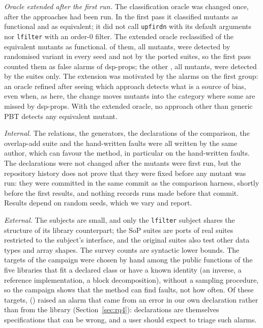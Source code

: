 \documentclass[10pt,conference]{IEEEtran}
\newcommand{\code}[1]{\texttt{#1}}
\begin{document}
\emph{Oracle extended after the first run.} The classification oracle was
changed once, after the approaches had been run. In the first pass it
classified \oracleFirstFunctional{} mutants as functional and
\oracleFirstEquivalent{} as equivalent; it did not call \code{upfirdn} with its
default arguments nor \code{lfilter} with an order-0 filter. The extended
oracle reclassified \nReclassified{} of the equivalent mutants as functional.
\reclDspOnly{} of them, all \reclDspOnlySubject{} mutants, were detected by
\reclDspAllVariants{} randomised variant in every seed and not by the ported
suites, so the first pass counted them as false alarms of dsp-props; the other
\reclSopOnly{}, all \reclSopOnlySubject{} mutants, were detected by the suites
only. The extension was motivated by the alarms on the first group: an oracle
refined after seeing which approach detects what is a source of bias, even
when, as here, the change moves mutants into the category where some are
missed by dsp-props. With the extended oracle, no approach other than generic
PBT detects any equivalent mutant.

\emph{Internal.} The relations, the generators, the declarations of the
comparison, the overlap-add suite and the hand-written faults were all written
by the same author, which can favour the method, in particular on the
hand-written faults. The declarations were not changed after the mutants were
first run, but the repository history does not prove that they were fixed before any mutant
was run: they were committed in the same commit as the comparison harness,
shortly before the first results, and nothing records runs made before that
commit. Results depend on random seeds, which we
vary and report.

\emph{External.} The subjects are small, and only the \code{lfilter} subject
shares the structure of its library counterpart; the SoP suites are ports of
real suites restricted to the subject's interface, and the original suites
also test other data types and array shapes. The survey counts are syntactic
lower bounds. The \campaignTargets{} targets of the campaign were chosen by
hand among the public functions of the five libraries that fit a declared
class or have a known identity (an inverse, a reference implementation, a
block decomposition), without a sampling procedure, so the campaign shows that
the method can find faults, not how often. Of these targets,
\campaignTriaged{} (\campaignTriagedShare) raised an alarm that came from an
error in our own declaration rather than from the library
(Section~\ref{sec:rq4}): declarations are themselves specifications that can be
wrong, and a user should expect to triage such alarms.
\end{document}
